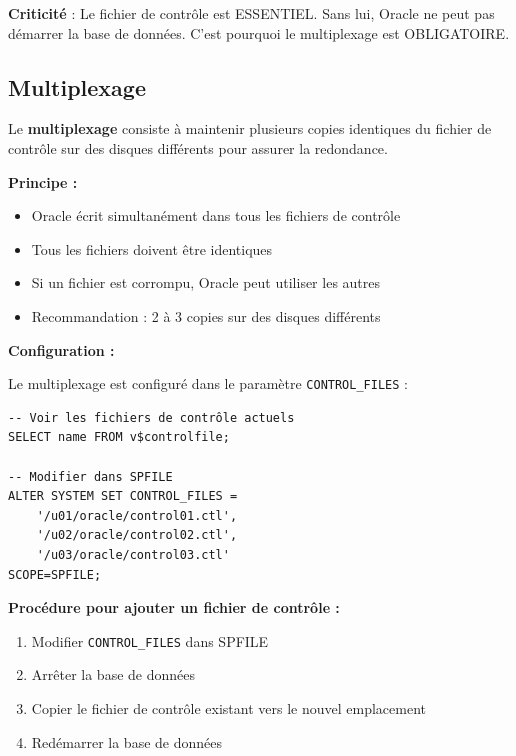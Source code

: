 \documentclass[11pt,a4paper]{article}
\begin{document}
\begin{importantbox}
\textbf{Criticité} : Le fichier de contrôle est ESSENTIEL. Sans lui, Oracle ne peut pas démarrer la base de données. C'est pourquoi le multiplexage est OBLIGATOIRE.
\end{importantbox}

\subsection{Multiplexage}

\begin{definitionbox}
Le \textbf{multiplexage} consiste à maintenir plusieurs copies identiques du fichier de contrôle sur des disques différents pour assurer la redondance.
\end{definitionbox}

\textbf{Principe :}
\begin{itemize}
    \item Oracle écrit simultanément dans tous les fichiers de contrôle
    \item Tous les fichiers doivent être identiques
    \item Si un fichier est corrompu, Oracle peut utiliser les autres
    \item Recommandation : 2 à 3 copies sur des disques différents
\end{itemize}

\textbf{Configuration :}

Le multiplexage est configuré dans le paramètre \texttt{CONTROL\_FILES} :

\begin{commandebox}
\begin{lstlisting}
-- Voir les fichiers de contrôle actuels
SELECT name FROM v$controlfile;

-- Modifier dans SPFILE
ALTER SYSTEM SET CONTROL_FILES = 
    '/u01/oracle/control01.ctl',
    '/u02/oracle/control02.ctl',
    '/u03/oracle/control03.ctl'
SCOPE=SPFILE;
\end{lstlisting}
\end{commandebox}

\textbf{Procédure pour ajouter un fichier de contrôle :}

\begin{enumerate}
    \item Modifier \texttt{CONTROL\_FILES} dans SPFILE
    \item Arrêter la base de données
    \item Copier le fichier de contrôle existant vers le nouvel emplacement
    \item Redémarrer la base de données
\end{enumerate}
\end{document}

